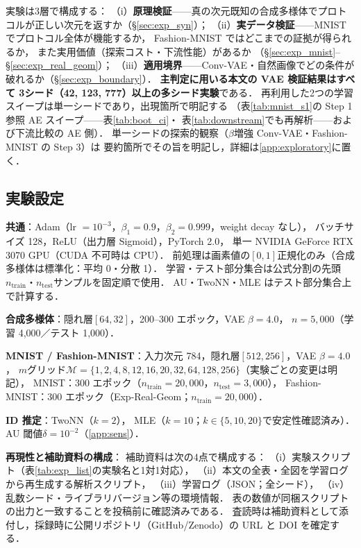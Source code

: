 \documentclass[11pt,a4paper]{jsarticle}
\begin{document}
実験は3層で構成する：
（i）\textbf{原理検証}——真の次元既知の合成多様体でプロトコルが正しい次元を返すか（§\ref{sec:exp_syn}）；
（ii）\textbf{実データ検証}——MNIST でプロトコル全体が機能するか，
Fashion-MNIST ではどこまでの証拠が得られるか，
また実用価値（探索コスト・下流性能）があるか
（§\ref{sec:exp_mnist}--§\ref{sec:exp_real_geom}）；
（iii）\textbf{適用境界}——Conv-VAE・自然画像でどの条件が破れるか（§\ref{sec:exp_boundary}）．
\textbf{主判定に用いる本文の VAE 検証結果はすべて
3シード（42, 123, 777）以上の多シード実験}である．
再利用した2つの学習スイープは単一シードであり，出現箇所で明記する
（表\ref{tab:mnist_s1}の Step 1 参照 AE スイープ——表\ref{tab:boot_ci}・
表\ref{tab:downstream}でも再解析——および下流比較の AE 側）．
単一シードの探索的観察（$\beta$増強 Conv-VAE・Fashion-MNIST の Step 3）は
要約箇所でその旨を明記し，詳細は\ref{app:exploratory}に置く．

\subsection{実験設定}\label{sec:exp_setup}

\textbf{共通}：Adam（lr $= 10^{-3}$，$\beta_1 = 0.9$，$\beta_2 = 0.999$，weight decay なし），
バッチサイズ 128，ReLU（出力層 Sigmoid），PyTorch 2.0，
単一 NVIDIA GeForce RTX 3070 GPU（CUDA 不可時は CPU）．
前処理は画素値の$[0,1]$正規化のみ（合成多様体は標準化：平均 0・分散 1）．
学習・テスト部分集合は公式分割の先頭$n_{\mathrm{train}}$・$n_{\mathrm{test}}$サンプルを固定順で使用．
AU・TwoNN・MLE はテスト部分集合上で計算する．

\textbf{合成多様体}：隠れ層$[64, 32]$，200--300 エポック，VAE $\beta = 4.0$，
$n = 5{,}000$（学習 4,000／テスト 1,000）．

\textbf{MNIST / Fashion-MNIST}：入力次元 784，隠れ層$[512, 256]$，VAE $\beta = 4.0$，
$m$グリッド$\mathcal{M} = \{1, 2, 4, 8, 12, 16, 20, 32, 64, 128, 256\}$（実験ごとの変更は明記），
MNIST：300 エポック（$n_{\mathrm{train}} = 20{,}000$，$n_{\mathrm{test}} = 3{,}000$），
Fashion-MNIST：300 エポック（Exp-Real-Geom；$n_{\mathrm{train}} = 20{,}000$）．

\textbf{ID 推定}：TwoNN（$k = 2$）\cite{facco2017twonn}，
MLE（$k = 10$；$k \in \{5, 10, 20\}$で安定性確認済み）\cite{levina2005mle}．
AU 閾値$\delta = 10^{-2}$（\ref{app:sens}）．

\textbf{再現性と補助資料の構成}：
補助資料は次の4点で構成する：
（i）実験スクリプト（表\ref{tab:exp_list}の実験名と1対1対応），
（ii）本文の全表・全図を学習ログから再生成する解析スクリプト，
（iii）学習ログ（JSON；全シード），
（iv）乱数シード・ライブラリバージョン等の環境情報．
表の数値が同梱スクリプトの出力と一致することを投稿前に確認済みである．
査読時は補助資料として添付し，採録時に公開リポジトリ（GitHub/Zenodo）の
URL と DOI を確定する．
\end{document}
